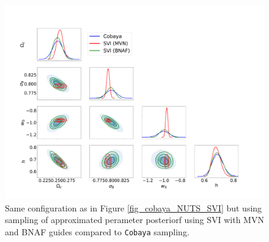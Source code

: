 \documentclass[twocolumn,twocolappendix,nofootinbib,iop]{openjournal}
\begin{document}
%
\begin{figure}
\centering
\includegraphics[width=1.5\columnwidth]{figures/fig_Cobaya_SVIs_v1.pdf}
\caption{Same configuration as in Figure \ref{fig_cobaya_NUTS_SVI} but using sampling of approximated perameter posteriorf using SVI with MVN and BNAF guides compared to \texttt{Cobaya} sampling.}
\label{fig_cobaya_SVIs}
\end{figure}
%
%
\end{document}
